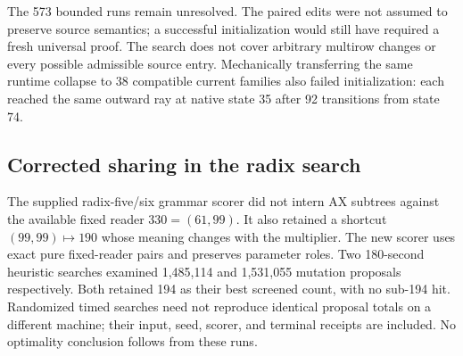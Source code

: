 The 573 bounded runs remain unresolved. The paired edits were not
assumed to preserve source semantics; a successful initialization
would still have required a fresh universal proof. The search does
not cover arbitrary multirow changes or every possible admissible
source entry. Mechanically transferring the same runtime collapse
to 38 compatible current families also failed initialization: each
reached the same outward ray at native state 35 after 92 transitions
from state 74.

\subsection{Corrected sharing in the radix search}

The supplied radix-five/six grammar scorer did not intern AX subtrees
against the available fixed reader $330=(61,99)$. It also retained a
shortcut $(99,99)\mapsto190$ whose meaning changes with the multiplier.
The new scorer uses exact pure fixed-reader pairs and preserves
parameter roles. Two 180-second heuristic searches examined
1,485,114 and 1,531,055 mutation proposals respectively. Both retained
194 as their best screened count, with no sub-194 hit. Randomized
timed searches need not reproduce identical proposal totals on a
different machine; their input, seed, scorer, and terminal receipts
are included. No optimality conclusion follows from these runs.
